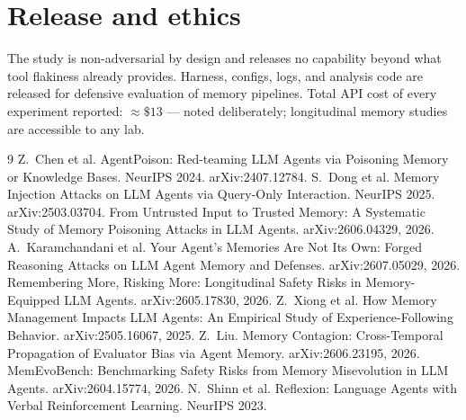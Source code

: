 \documentclass[11pt]{article}
\begin{document}
\section{Release and ethics}
The study is non-adversarial by design and releases no capability beyond what tool flakiness already provides. Harness, configs, logs, and analysis code are released for defensive evaluation of memory pipelines. Total API cost of every experiment reported: ${\approx}\$13$ --- noted deliberately; longitudinal memory studies are accessible to any lab.

\begin{thebibliography}{9}\small
{} Z.~Chen et al. AgentPoison: Red-teaming LLM Agents via Poisoning Memory or Knowledge Bases. NeurIPS 2024. arXiv:2407.12784.
 S.~Dong et al. Memory Injection Attacks on LLM Agents via Query-Only Interaction. NeurIPS 2025. arXiv:2503.03704.
 From Untrusted Input to Trusted Memory: A Systematic Study of Memory Poisoning Attacks in LLM Agents. arXiv:2606.04329, 2026.
 A.~Karamchandani et al. Your Agent's Memories Are Not Its Own: Forged Reasoning Attacks on LLM Agent Memory and Defenses. arXiv:2607.05029, 2026.
 Remembering More, Risking More: Longitudinal Safety Risks in Memory-Equipped LLM Agents. arXiv:2605.17830, 2026.
 Z.~Xiong et al. How Memory Management Impacts LLM Agents: An Empirical Study of Experience-Following Behavior. arXiv:2505.16067, 2025.
 Z.~Liu. Memory Contagion: Cross-Temporal Propagation of Evaluator Bias via Agent Memory. arXiv:2606.23195, 2026.
 MemEvoBench: Benchmarking Safety Risks from Memory Misevolution in LLM Agents. arXiv:2604.15774, 2026.
 N.~Shinn et al. Reflexion: Language Agents with Verbal Reinforcement Learning. NeurIPS 2023.
\end{thebibliography}
\end{document}
